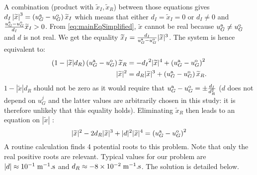A combination (product with ${\widetilde{x}_I}, \widetilde{x}_R$)
between those equations gives
${d_I}\left|\widetilde{x}\right|^3 = \left(u_G^{\rm a} - u_G^{\rm o}\right) {\widetilde{x}_I}$ which means that either ${d_I}=\widetilde{x}_I=0$ or ${d_I}\neq 0$ and $\frac{u_G^{\rm a} - u_G^{\rm o}}{{d_I}}{\widetilde{x}_I}>0$.
From \eqref{eq:mainEqSimplified}, $\widetilde{x}$ cannot be real because $u_G^{\rm a} \neq u_G^{\rm o}$ and $d$ is not real.
We get the equality
$\widetilde{x}_I = \frac{{d_I}}{u_G^{\rm a} - u_G^{\rm o}} |\widetilde{x}|^3$.
The system is hence equivalent to:
\begin{equation}
    \begin{aligned}
    \left(1 - |\widetilde{x}| d_R\right)
    \left(u_G^{\rm a} - u_G^{\rm o}\right)\widetilde{x}_R &=
    -{d_I}^2 |\widetilde{x}|^4 + \left(u_G^{\rm a} - u_G^{\rm o}\right)^2 \\
    |\widetilde{x}|^2 &=
    {d_R} |\widetilde{x}|^3 + \left(u_G^{\rm a} - u_G^{\rm o}\right)\widetilde{x}_R.
    \end{aligned}
\end{equation}
$1 - |\widetilde{x}| d_R$ should not be zero as it would require that $u_G^{\rm a} - u_G^{\rm o} = \pm \frac{d_I}{d_R^2}$ ($d$ does not depend on $u_G^j$ and the latter values are arbitrarily chosen in this study:
it is therefore unlikely that this equality holds).
Eliminating $\widetilde{x}_R$ then leads to an equation on $|\widetilde{x}|$ :
\begin{equation} \label{eq:mainPolynomial}
    |\widetilde{x}|^2 -  2{d_R} |\widetilde{x}|^3 + 
    |d|^2 |\widetilde{x}|^4
    =\left(u_G^{\rm a} - u_G^{\rm o}\right)^2
\end{equation}
A routine calculation finds 4 potential roots to this problem. Note that only the real positive roots are relevant.
Typical values for our problem are 
$|d| \approx 10^{-1} \;{\rm m}^{-1}.{\rm s}$ and
$d_R \approx -8 \times 10^{-2}\;{\rm m}^{-1}.{\rm s}$.
The solution is detailed below.
